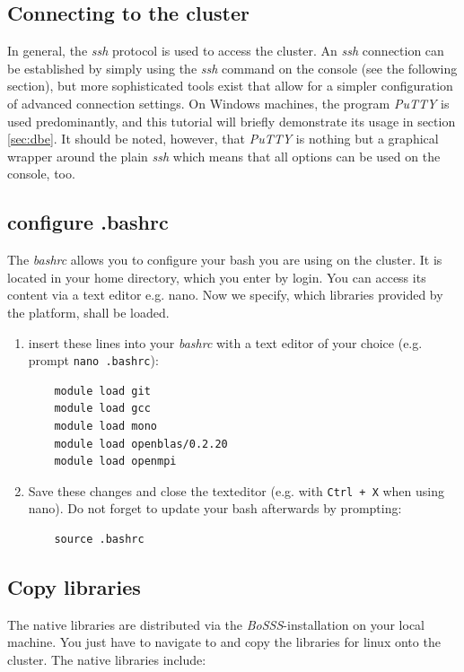 \documentclass[11pt,twoside,a4paper]{fdyartcl}
\newcommand{\Bosss}{\textit{BoSSS}}
\begin{document}
\subsection{Connecting to the cluster}
\label{sec:putty}
In general, the \emph{ssh} protocol is used to access the cluster. An \emph{ssh} connection can be established by simply using the \emph{ssh} command on the console (see the following section), but more sophisticated tools exist that allow for a simpler configuration of advanced connection settings. On Windows machines, the program \emph{PuTTY} is used predominantly, and this tutorial will briefly demonstrate its usage in section \ref{sec:dbe}. It should be noted, however, that \emph{PuTTY} is nothing but a graphical wrapper around the plain \emph{ssh} which means that all options can be used on the console, too.

\subsection{configure .bashrc}
\label{sec:bashconfig}
The \textit{bashrc} allows you to configure your bash you are using on the cluster. It is located in your home directory, which you enter by login. You can access its content via a text editor e.g. nano. Now we specify, which libraries provided by the platform, shall be loaded.
\begin{enumerate}
	\item insert these lines into your \textit{bashrc} with a text editor of your choice (e.g. prompt \verb|nano .bashrc|):
	\begin{verbatim}
	module load git
	module load gcc
	module load mono
	module load openblas/0.2.20
	module load openmpi
	\end{verbatim}
	
	\item Save these changes and close the texteditor (e.g. with \verb|Ctrl + X| when using nano). Do not forget to update your bash afterwards by prompting:
	\begin{verbatim}
	source .bashrc
	\end{verbatim}
\end{enumerate}


\subsection{Copy libraries}
\label{sec:copylibs}
The native libraries are distributed via the \Bosss-installation on your local machine. You just have to navigate to and copy the libraries for linux onto the cluster. The native libraries include:
\end{document}
